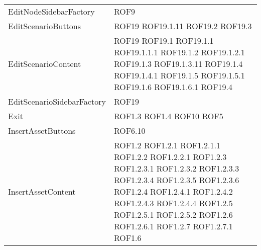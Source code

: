 \begin{longtable}{p{5cm}!{\VRule[1pt]}p{2.5cm}}
		EditNodeSidebarFactory & ROF9\\
		EditScenarioButtons & ROF19 \newline ROF19.1.11 \newline ROF19.2 \newline ROF19.3\\
		EditScenarioContent & ROF19 \newline ROF19.1 \newline ROF19.1.1 \newline ROF19.1.1.1 \newline ROF19.1.2 \newline ROF19.1.2.1 \newline ROF19.1.3 \newline ROF19.1.3.11 \newline ROF19.1.4 \newline ROF19.1.4.1 \newline ROF19.1.5 \newline ROF19.1.5.1 \newline ROF19.1.6 \newline ROF19.1.6.1 \newline ROF19.4\\
		EditScenarioSidebarFactory & ROF19\\
		Exit & ROF1.3 \newline ROF1.4 \newline ROF10 \newline ROF5\\
		InsertAssetButtons & ROF6.10\\
		InsertAssetContent & ROF1.2 \newline ROF1.2.1 \newline ROF1.2.1.1 \newline ROF1.2.2 \newline ROF1.2.2.1 \newline ROF1.2.3 \newline ROF1.2.3.1 \newline ROF1.2.3.2 \newline ROF1.2.3.3 \newline ROF1.2.3.4 \newline ROF1.2.3.5 \newline ROF1.2.3.6 \newline ROF1.2.4 \newline ROF1.2.4.1 \newline ROF1.2.4.2 \newline ROF1.2.4.3 \newline ROF1.2.4.4 \newline ROF1.2.5 \newline ROF1.2.5.1 \newline ROF1.2.5.2 \newline ROF1.2.6 \newline ROF1.2.6.1 \newline ROF1.2.7 \newline ROF1.2.7.1 \newline ROF1.6\\

\end{longtable}
